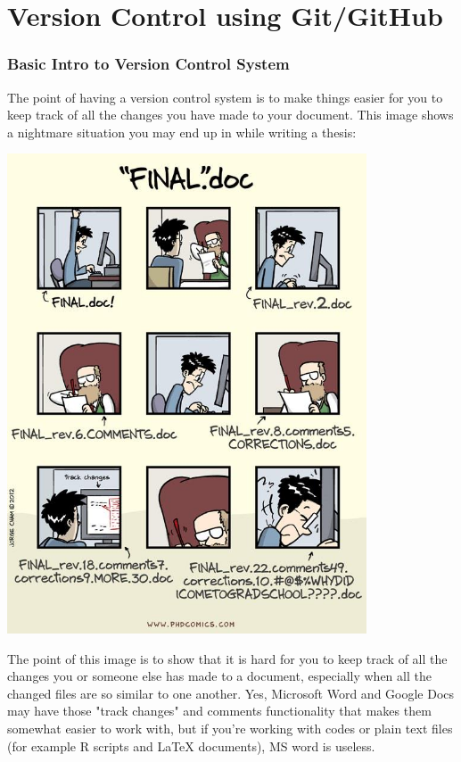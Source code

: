 \documentclass[a4paper, 12pt]{article}
\begin{document}
\part*{Version Control using Git/GitHub}

\section*{Basic Intro to Version Control System}

The point of having a version control system is to make things easier for you to keep track of all the changes you  have made to your document.
This image shows a nightmare situation you may end up in while writing a thesis:\\
\begin{center}
\includegraphics[width=0.8\textwidth]{./images/index}
\end{center}

The point of this image is to show that it is hard for you to keep track of all the changes you or someone else has made to a document, especially when all the changed files are so similar to one another.
Yes, Microsoft Word and Google Docs may have those "track changes" and comments functionality that makes them somewhat easier to work with, but if you're working with codes or plain text files (for example R scripts and \LaTeX{} documents), MS word is useless.
\end{document}
